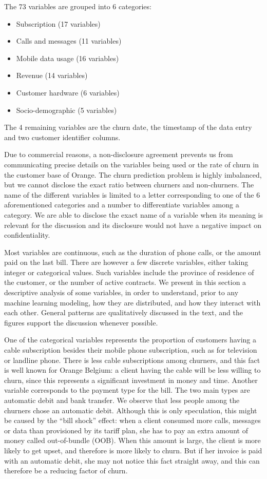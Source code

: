 The 73 variables are grouped into 6 categories:
\noprelistbreak
\begin{itemize}
    \item Subscription (17 variables)
    \item Calls and messages (11 variables)
    \item Mobile data usage (16 variables)
    \item Revenue (14 variables)
    \item Customer hardware (6 variables)
    \item Socio-demographic (5 variables)
\end{itemize}
The 4 remaining variables are the churn date, the timestamp of the data entry and
two customer identifier columns.

Due to commercial reasons, a non-disclosure agreement prevents us from
communicating precise details on the variables being used or the rate of churn
in the customer base of Orange. The churn prediction problem is highly
imbalanced, but we cannot disclose the exact ratio between churners and
non-churners. The name of the different variables is limited to a letter
corresponding to one of the 6 aforementioned categories and a number to
differentiate variables among a category. We are able to disclose the exact name
of a variable when its meaning is relevant for the discussion and its disclosure
would not have a negative impact on confidentiality.

Most variables are continuous, such as the duration of phone calls, or the
amount paid on the last bill. There are however a few discrete variables, either
taking integer or categorical values. Such variables include the province of
residence of the customer, or the number of active contracts. We present in this
section a descriptive analysis of some variables, in order to understand, prior
to any machine learning modeling, how they are distributed, and how they
interact with each other. General patterns are qualitatively discussed in the
text, and the figures support the discussion whenever possible.

One of the categorical variables represents the proportion of customers having a
cable subscription besides their mobile phone subscription, such as for
television or landline phone. There is less cable subscriptions among churners,
and this fact is well known for Orange Belgium: a client having the cable will
be less willing to churn, since this represents a significant investment in
money and time. Another variable corresponds to the payment type for the bill.
The two main types are automatic debit and bank transfer. We observe that less
people among the churners chose an automatic debit. Although this is only
speculation, this might be caused by the ``bill shock'' effect: when a client
consumed more calls, messages or data than provisioned by its tariff plan, she
has to pay an extra amount of money called out-of-bundle (OOB). When this amount
is large, the client is more likely to get upset, and therefore is more likely
to churn. But if her invoice is paid with an automatic debit, she may not notice
this fact straight away, and this can therefore be a reducing factor of churn.

